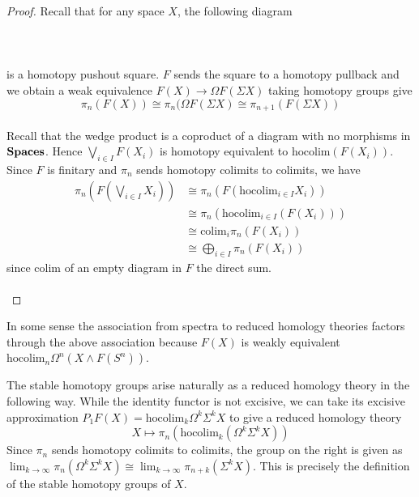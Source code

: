 \documentclass[a4paper]{article}
\begin{document}
\begin{thm}{}{}
\begin{proof}
Recall that for any space $X$, the following diagram \\~\\
\\~\\
is a homotopy pushout square. $F$ sends the square to a homotopy pullback and we obtain a weak equivalence $F(X)\to\Omega F(\Sigma X)$ taking homotopy groups give $$\pi_n(F(X))\cong\pi_n(\Omega F(\Sigma X)\cong\pi_{n+1}(F(\Sigma X))$$~\\

Recall that the wedge product is a coproduct of a diagram with no morphisms in $\bold{Spaces}$. Hence $\bigvee_{i\in I}F(X_i)$ is homotopy equivalent to $\text{hocolim}(F(X_i))$. Since $F$ is finitary and $\pi_n$ sends homotopy colimits to colimits, we have 
\begin{align*}
\pi_n\left(F\left(\bigvee_{i\in I}X_i\right)\right)&\cong\pi_n(F(\text{hocolim}_{i\in I}X_i))\\
&\cong\pi_n(\text{hocolim}_{i\in I}(F(X_i)))\\
&\cong\text{colim}_i\pi_n(F(X_i))\\
&\cong\bigoplus_{i\in I}\pi_n(F(X_i))
\end{align*}
since $\text{colim}$ of an empty diagram in $F$ the direct sum. \\~\\
\end{proof}
\end{thm}

In some sense the association from spectra to reduced homology theories factors through the above association because $F(X)$ is weakly equivalent $\text{hocolim}_n\Omega^n(X\wedge F(S^n))$. 

\begin{eg}{}{} The stable homotopy groups arise naturally as a reduced homology theory in the following way. While the identity functor is not excisive, we can take its excisive approximation $P_1F(X)=\text{hocolim}_k\Omega^k\Sigma^k X$ to give a reduced homology theory $$X\mapsto\pi_n(\text{hocolim}_k(\Omega^k\Sigma^kX))$$ Since $\pi_n$ sends homotopy colimits to colimits, the group on the right is given as $\lim_{k\to\infty}\pi_n(\Omega^k\Sigma^k X)\cong\lim_{k\to\infty}\pi_{n+k}(\Sigma^k X)$. This is precisely the definition of the stable homotopy groups of $X$. 
\end{eg}
\end{document}
